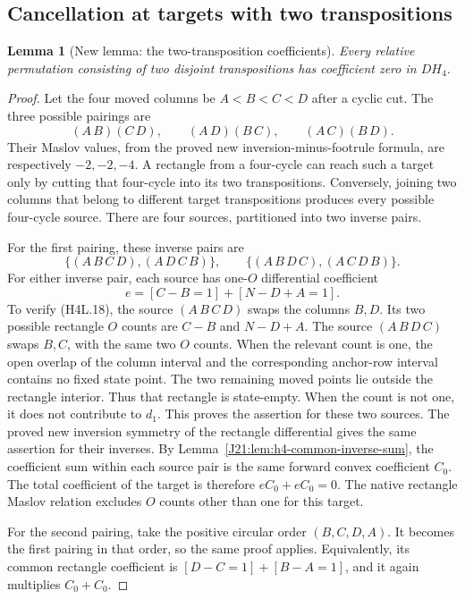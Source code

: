 \documentclass[11pt,oneside]{report}
\newtheorem{lemma}[theorem]{Lemma}
\theoremstyle{definition}
\numberwithin{equation}{section}
\begin{document}
\subsection{Cancellation at targets with two transpositions}

\begin{lemma}[New lemma: the two-transposition coefficients]
\label{J21:lem:h4-double-transposition-cancellation}
Every relative permutation consisting of two disjoint transpositions
has coefficient zero in $D H_4$.
\end{lemma}
\begin{proof}
Let the four moved columns be $A<B<C<D$ after a cyclic cut.
The three possible pairings are
\[
 (A\,B)(C\,D),\qquad
 (A\,D)(B\,C),\qquad
 (A\,C)(B\,D).
\]
Their Maslov values, from the proved new inversion-minus-footrule
formula, are respectively $-2,-2,-4$.
A rectangle from a four-cycle can reach such a target only by
cutting that four-cycle into its two transpositions.
Conversely, joining two columns that belong to different target
transpositions produces every possible four-cycle source.
There are four sources, partitioned into two inverse pairs.

For the first pairing, these inverse pairs are
\[
 \{(A\,B\,C\,D),(A\,D\,C\,B)\},\qquad
 \{(A\,B\,D\,C),(A\,C\,D\,B)\}.
\]
For either inverse pair, each source has one-$O$ differential
coefficient
\[
                  e=[C-B=1]+[N-D+A=1].
 \tag{H4L.18}
\]
To verify (H4L.18), the source $(A\,B\,C\,D)$ swaps the columns
$B,D$.
Its two possible rectangle $O$ counts are $C-B$ and $N-D+A$.
The source $(A\,B\,D\,C)$ swaps $B,C$, with the same two
$O$ counts.
When the relevant count is one, the open overlap of the column
interval and the corresponding anchor-row interval contains no fixed
state point. The two remaining moved points lie outside the
rectangle interior. Thus that rectangle is state-empty.
When the count is not one, it does not contribute to $d_1$.
This proves the assertion for these two sources.
The proved new inversion symmetry of the rectangle differential
gives the same assertion for their inverses.
By Lemma~\ref{J21:lem:h4-common-inverse-sum}, the coefficient sum
within each source pair is the same forward convex coefficient $C_0$.
The total coefficient of the target is therefore $eC_0+eC_0=0$.
The native rectangle Maslov relation excludes $O$ counts other than
one for this target.

For the second pairing, take the positive circular order
$(B,C,D,A)$.
It becomes the first pairing in that order, so the same proof applies.
Equivalently, its common rectangle coefficient is
$[D-C=1]+[B-A=1]$, and it again multiplies $C_0+C_0$.


\end{proof}
\end{document}
